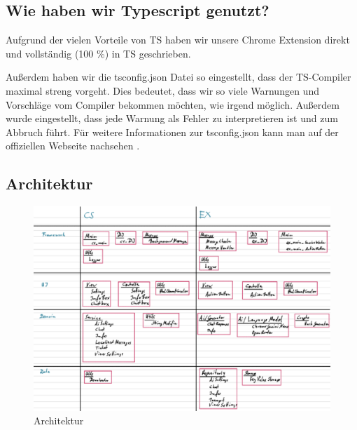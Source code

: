 \subsection{Wie haben wir Typescript genutzt?}

Aufgrund der vielen Vorteile von TS haben wir unsere Chrome Extension direkt und vollständig (100 \%) in TS geschrieben.

Außerdem haben wir die tsconfig.json Datei so eingestellt, dass der TS-Compiler maximal streng vorgeht. Dies bedeutet, dass wir so viele Warnungen und Vorschläge vom Compiler bekommen möchten, wie irgend möglich. Außerdem wurde eingestellt, dass jede Warnung als Fehler zu interpretieren ist und zum Abbruch führt. Für weitere Informationen zur tsconfig.json kann man auf der offiziellen Webseite \cite{tsconfig} nachsehen .

\subsection{Architektur}

\begin{figure}[htbp]
    \centering
    \includegraphics[width=1\textwidth]{img/Architektur.png}
    \caption{Architektur}
    \label{fig:Architektur}
  \end{figure}
